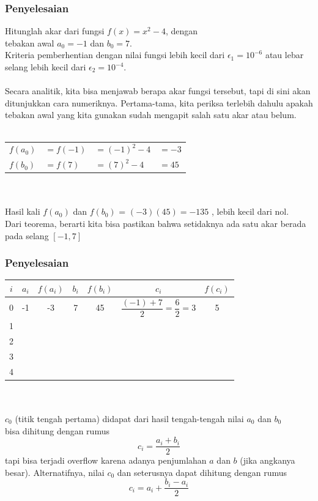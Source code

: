 \documentclass{beamer}
\begin{document}

\begin{frame}
\frametitle{Penyelesaian}
Hitunglah akar dari fungsi $f(x)=x^2-4$, dengan \\tebakan awal $a_0=-1$ dan $b_0=7$. \\Kriteria pemberhentian dengan nilai fungsi lebih kecil dari $\epsilon_1 = 10^{-6}$ atau lebar selang lebih kecil dari $\epsilon_2 = 10^{-4}$.
\\\ \\Secara analitik, kita bisa menjawab berapa akar fungsi tersebut, tapi di sini akan ditunjukkan cara numeriknya. Pertama-tama, kita periksa terlebih dahulu apakah tebakan awal yang kita gunakan sudah mengapit salah satu akar atau belum.
\\\ \\
\begin{tabular}{llll}
$f(a_0)$ & $= f(-1)$ & $= (-1)^2-4$ & $= -3$\\
$f(b_0)$ & $= f(7)$ & $= (7)^2-4$ & $= 45$
\end{tabular}
\\\ \\Hasil kali $f(a_0)$ dan $f(b_0)$ = $(-3)(45) =-135$ , lebih kecil dari nol.
\\Dari teorema, berarti kita bisa pastikan bahwa setidaknya ada satu akar berada pada selang $[-1,7]$
\end{frame}


\begin{frame}
\frametitle{Penyelesaian}
\begin{tabular}{|c|c|c|c|c|c|c|}
\hline
	$i$ & $a_i$ & $f(a_i)$ & $b_i$ & $f(b_i)$ & $c_i$ & $f(c_i)$\\
\hline
	0 & -1 & -3 & 7 & 45 & $\dfrac{(-1)+7}{2}=\dfrac{6}{2}=3$ & 5\\
\hline
	1 &  &  &  &  &  & \\
\hline
	2 &  &  &  &  &  & \\
\hline
	3 &  &  &  &  &  & \\
\hline
	4 &  &  &  &  &  & \\
\hline
\end{tabular}
\\\ \\$c_0$ (titik tengah pertama) didapat dari hasil tengah-tengah nilai $a_0$ dan $b_0$
\\bisa dihitung dengan rumus 
\begin{equation}
c_i= \dfrac{a_i+b_i}{2}
\nonumber
\end{equation}
tapi bisa terjadi overflow karena adanya penjumlahan $a$ dan $b$ (jika angkanya besar). Alternatifnya, nilai $c_0$ dan seterusnya dapat dihitung dengan rumus 
\begin{equation}
c_i= a_i + \dfrac{b_i-a_i}{2}
\nonumber
\end{equation}
\end{frame}
\end{document}
